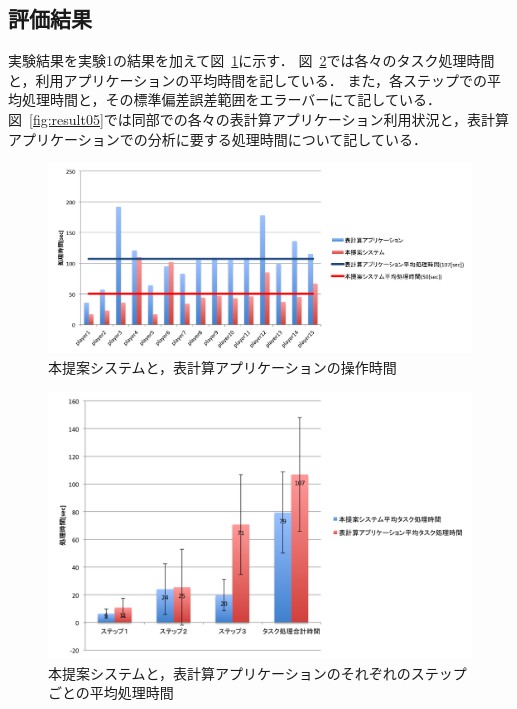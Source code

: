\documentclass[sotsuron]{kuee}
\begin{document}
		\subsection{評価結果}
			実験結果を実験1の結果を加えて図~\ref{fig:result03}に示す．
			図~\ref{fig:result04}では各々のタスク処理時間と，利用アプリケーションの平均時間を記している．
			また，各ステップでの平均処理時間と，その標準偏差誤差範囲をエラーバーにて記している．
			図~\ref{fig:result05}では同部での各々の表計算アプリケーション利用状況と，表計算アプリケーションでの分析に要する処理時間について記している．
			\begin{figure}
				\begin{center}
					\includegraphics[width=\linewidth]{./png/result03.png}
				\end{center}
				\caption{本提案システムと，表計算アプリケーションの操作時間}
		  		\label{fig:result03}
			\end{figure}
			\begin{figure}
				\begin{center}
					\includegraphics[width=\linewidth]{./png/result04.png}
				\end{center}
				\caption{本提案システムと，表計算アプリケーションのそれぞれのステップごとの平均処理時間}
		  		\label{fig:result04}
			\end{figure}
\end{document}
